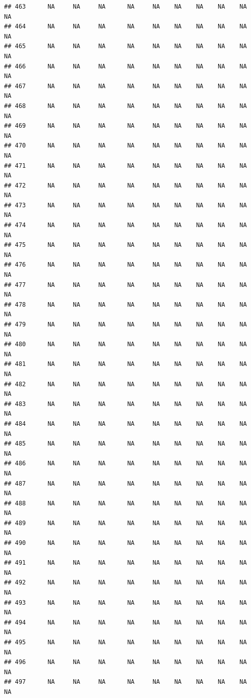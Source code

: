 \documentclass{article}\usepackage{graphicx, color}
\makeatletter
\newenvironment{kframe}{%
 \def\at@end@of@kframe{}%
 \ifinner\ifhmode%
  \def\at@end@of@kframe{\end{minipage}}%
  \begin{minipage}{\columnwidth}%
 \fi\fi%
 \def\FrameCommand##1{\hskip\@totalleftmargin \hskip-\fboxsep
 \colorbox{shadecolor}{##1}\hskip-\fboxsep
     \hskip-\linewidth \hskip-\@totalleftmargin \hskip\columnwidth}%
 \MakeFramed {\advance\hsize-\width
   \@totalleftmargin\z@ \linewidth\hsize
   \@setminipage}}%
 {\par\unskip\endMakeFramed%
 \at@end@of@kframe}
\newenvironment{knitrout}{}{} %
\makeatother
\begin{document}
\begin{knitrout}
\begin{kframe}
\begin{verbatim}
## 463      NA     NA     NA      NA     NA    NA    NA    NA    NA     NA
## 464      NA     NA     NA      NA     NA    NA    NA    NA    NA     NA
## 465      NA     NA     NA      NA     NA    NA    NA    NA    NA     NA
## 466      NA     NA     NA      NA     NA    NA    NA    NA    NA     NA
## 467      NA     NA     NA      NA     NA    NA    NA    NA    NA     NA
## 468      NA     NA     NA      NA     NA    NA    NA    NA    NA     NA
## 469      NA     NA     NA      NA     NA    NA    NA    NA    NA     NA
## 470      NA     NA     NA      NA     NA    NA    NA    NA    NA     NA
## 471      NA     NA     NA      NA     NA    NA    NA    NA    NA     NA
## 472      NA     NA     NA      NA     NA    NA    NA    NA    NA     NA
## 473      NA     NA     NA      NA     NA    NA    NA    NA    NA     NA
## 474      NA     NA     NA      NA     NA    NA    NA    NA    NA     NA
## 475      NA     NA     NA      NA     NA    NA    NA    NA    NA     NA
## 476      NA     NA     NA      NA     NA    NA    NA    NA    NA     NA
## 477      NA     NA     NA      NA     NA    NA    NA    NA    NA     NA
## 478      NA     NA     NA      NA     NA    NA    NA    NA    NA     NA
## 479      NA     NA     NA      NA     NA    NA    NA    NA    NA     NA
## 480      NA     NA     NA      NA     NA    NA    NA    NA    NA     NA
## 481      NA     NA     NA      NA     NA    NA    NA    NA    NA     NA
## 482      NA     NA     NA      NA     NA    NA    NA    NA    NA     NA
## 483      NA     NA     NA      NA     NA    NA    NA    NA    NA     NA
## 484      NA     NA     NA      NA     NA    NA    NA    NA    NA     NA
## 485      NA     NA     NA      NA     NA    NA    NA    NA    NA     NA
## 486      NA     NA     NA      NA     NA    NA    NA    NA    NA     NA
## 487      NA     NA     NA      NA     NA    NA    NA    NA    NA     NA
## 488      NA     NA     NA      NA     NA    NA    NA    NA    NA     NA
## 489      NA     NA     NA      NA     NA    NA    NA    NA    NA     NA
## 490      NA     NA     NA      NA     NA    NA    NA    NA    NA     NA
## 491      NA     NA     NA      NA     NA    NA    NA    NA    NA     NA
## 492      NA     NA     NA      NA     NA    NA    NA    NA    NA     NA
## 493      NA     NA     NA      NA     NA    NA    NA    NA    NA     NA
## 494      NA     NA     NA      NA     NA    NA    NA    NA    NA     NA
## 495      NA     NA     NA      NA     NA    NA    NA    NA    NA     NA
## 496      NA     NA     NA      NA     NA    NA    NA    NA    NA     NA
## 497      NA     NA     NA      NA     NA    NA    NA    NA    NA     NA

\end{verbatim}
\end{kframe}
\end{knitrout}
\end{document}
